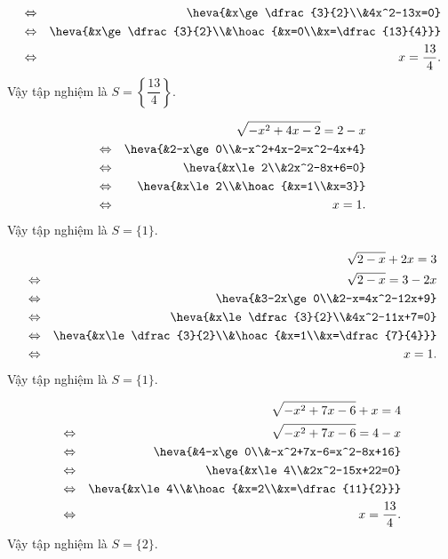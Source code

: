 \begin{baitap}
{\begin{listEX}[1]
\begin{eqnarray*}
				&\Leftrightarrow& \heva{&x\ge \dfrac{3}{2}\\&4x^2-13x=0}\\
				&\Leftrightarrow& \heva{&x\ge \dfrac{3}{2}\\&\hoac{&x=0\\&x=\dfrac{13}{4}}}\\
				&\Leftrightarrow& x=\dfrac{13}{4}.
			\end{eqnarray*}	
			Vậy tập nghiệm là $S=\left\{\dfrac{13}{4}\right\}$.	
			\item
			\begin{eqnarray*}
				&&\sqrt{-x^2+4x-2}=2-x\\
				&\Leftrightarrow& \heva{&2-x\ge 0\\&-x^2+4x-2=x^2-4x+4}\\
				&\Leftrightarrow& \heva{&x\le 2\\&2x^2-8x+6=0}\\
				&\Leftrightarrow& \heva{&x\le 2\\&\hoac{&x=1\\&x=3}}\\
				&\Leftrightarrow& x=1.
			\end{eqnarray*}	
			Vậy tập nghiệm là $S=\{1\}$.	
			\item 
			\begin{eqnarray*}
				&&\sqrt{2-x}+2x=3\\
				&\Leftrightarrow&\sqrt{2-x}=3-2x\\
				&\Leftrightarrow& \heva{&3-2x\ge 0\\&2-x=4x^2-12x+9}\\
				&\Leftrightarrow& \heva{&x\le \dfrac{3}{2}\\&4x^2-11x+7=0}\\
				&\Leftrightarrow& \heva{&x\le \dfrac{3}{2}\\&\hoac{&x=1\\&x=\dfrac{7}{4}}}\\
				&\Leftrightarrow& x=1.
			\end{eqnarray*}	
			Vậy tập nghiệm là $S=\{1\}$.	
			\item 
			\begin{eqnarray*}
				&&\sqrt{-x^2+7x-6}+x=4\\
				&\Leftrightarrow&\sqrt{-x^2+7x-6}=4-x\\
				&\Leftrightarrow& \heva{&4-x\ge 0\\&-x^2+7x-6=x^2-8x+16}\\
				&\Leftrightarrow& \heva{&x\le 4\\&2x^2-15x+22=0}\\
				&\Leftrightarrow& \heva{&x\le 4\\&\hoac{&x=2\\&x=\dfrac{11}{2}}}\\
				&\Leftrightarrow& x=\dfrac{13}{4}.
			\end{eqnarray*}	
			Vậy tập nghiệm là $S=\{2\}$.	
		\end{listEX}
	} 
\end{baitap}




